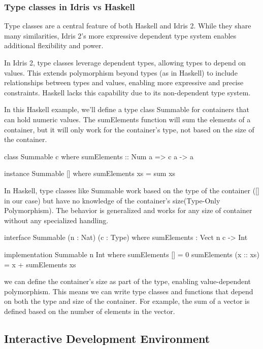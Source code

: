 \documentclass[]{rptuseminar}
\begin{document}
\subsubsection{Type classes in Idris vs Haskell} 
Type classes are a central feature of both Haskell and Idris 2. While they share many similarities, Idris 2's more expressive dependent type system enables additional flexibility and power.

In Idris 2, type classes leverage dependent types, allowing types to depend on values. This extends polymorphism beyond types (as in Haskell) to include relationships between types and values, enabling more expressive and precise constraints. Haskell lacks this capability due to its non-dependent type system.

In this Haskell example, we'll define a type class Summable for containers that can hold numeric values. The sumElements function will sum the elements of a container, but it will only work for the container's type, not based on the size of the container.
\begin{haskell}
  class Summable c where
  sumElements :: Num a => c a -> a

instance Summable [] where
  sumElements xs = sum xs  
\end{haskell}
In Haskell, type classes like Summable work based on the type of the container ([] in our case) but have no knowledge of the container's size(Type-Only Polymorphism). The behavior is generalized and works for any size of container without any specialized handling.
\begin{idris}
    interface Summable (n : Nat) (c : Type) where
    sumElements : Vect n c -> Int  
  
  
    implementation Summable n Int where
    sumElements [] = 0  
    sumElements (x :: xs) = x + sumElements xs  
  
\end{idris}
we can define the container's size as part of the type, enabling value-dependent polymorphism. This means we can write type classes and functions that depend on both the type and size of the container. For example, the sum of a vector is defined based on the number of elements in the vector.
\subsection{Interactive Development Environment}  
\label{subsec:ide}  
\end{document}
